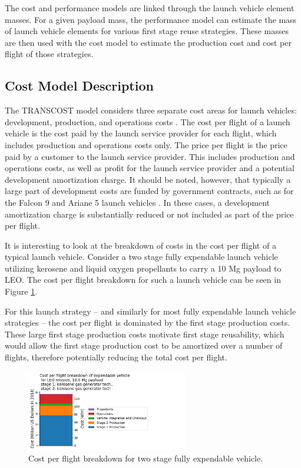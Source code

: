 \documentclass[conf]{new-aiaa}
\begin{document}
\begin{multicols}{2}
The cost and performance models are linked through the launch vehicle element masses. For a given payload mass, the performance model can estimate the mass of launch vehicle elements for various first stage reuse strategies. These masses are then used with the cost model to estimate the production cost and cost per flight of those strategies. 

\subsection{Cost Model Description}

The TRANSCOST model considers three separate cost areas for launch vehicles: development, production, and operations costs \cite{transcost}. The cost per flight of a launch vehicle is the cost paid by the launch service provider for each flight, which includes production and operations costs only. The price per flight is the price paid by a customer to the launch service provider. This includes production and operations costs, as well as profit for the launch service provider and a potential development amortization charge. It should be noted, however, that typically a large part of development costs are funded by government contracts, such as for the Falcon 9 and Ariane 5 launch vehicles \cite{NASAspaceX, ESAAriane5}. In these cases, a development amortization charge is substantially reduced or not included as part of the price per flight.



It is interesting to look at the breakdown of costs in the cost per flight of a typical launch vehicle. Consider a two stage fully expendable launch vehicle utilizing kerosene and liquid oxygen propellants to carry a 10 Mg payload to LEO. The cost per flight breakdown for such a launch vehicle can be seen in Figure \ref{fig:expendable_cost_breakdown}. 



For this launch strategy -- and similarly for most fully expendable launch vehicle strategies -- the cost per flight is dominated by the first stage production costs. These large first stage production costs motivate first stage reusability, which would allow the first stage production cost to be amortized over a number of flights, therefore potentially reducing the total cost per flight. 

\begin{figure}[H]
    \centering
    \includegraphics[width=0.63\textwidth]{../../lvreuse/analysis/combined/plots/expendable_cost_breakdown}
    \caption{\label{fig:expendable_cost_breakdown} Cost per flight breakdown for two stage fully expendable vehicle.}
\end{figure}


\end{multicols}
\end{document}
